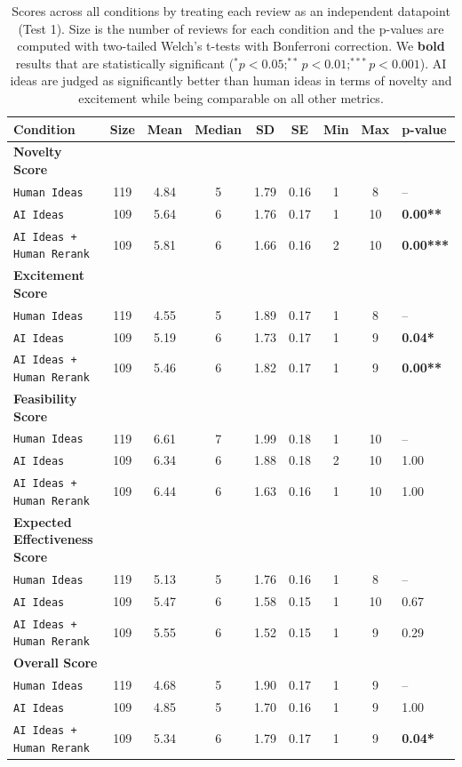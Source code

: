 \begin{table}[t]
\centering
\begin{tabular}{l c c c c c c c l} 
 \hline
 Condition & Size & Mean & Median & SD & SE & Min & Max & p-value \\ 
 \hline 
 \textbf{Novelty Score}  \\
 \texttt{Human Ideas} & 119 & 4.84 & 5 & 1.79 & 0.16 & 1 & 8 & -- \\
 \texttt{AI Ideas} & 109 & 5.64 & 6 & 1.76 & 0.17 & 1 & 10 & \textbf{0.00**} \\
 \texttt{AI Ideas + Human Rerank} & 109 & 5.81 & 6 & 1.66 & 0.16 & 2 & 10 & \textbf{0.00***} \\
\hline 
\textbf{Excitement Score} \\ 
 \texttt{Human Ideas} & 119 & 4.55 & 5 & 1.89 & 0.17 & 1 & 8 & -- \\
 \texttt{AI Ideas} & 109 & 5.19 & 6 & 1.73 & 0.17 & 1 & 9 & \textbf{0.04*} \\
 \texttt{AI Ideas + Human Rerank} & 109 & 5.46 & 6 & 1.82 & 0.17 & 1 & 9 & \textbf{0.00**} \\ 
\hline 
\textbf{Feasibility Score} \\ 
 \texttt{Human Ideas} & 119 & 6.61 & 7 & 1.99 & 0.18 & 1 & 10 & -- \\
 \texttt{AI Ideas} & 109 & 6.34 & 6 & 1.88 & 0.18 & 2 & 10 & 1.00 \\
 \texttt{AI Ideas + Human Rerank} & 109 & 6.44 & 6 & 1.63 & 0.16 & 1 & 10 & 1.00 \\
\hline 
\textbf{Expected Effectiveness Score} \\
 \texttt{Human Ideas} & 119 & 5.13 & 5 & 1.76 & 0.16 & 1 & 8 & -- \\ 
 \texttt{AI Ideas} & 109 & 5.47 & 6 & 1.58 & 0.15 & 1 & 10 & 0.67 \\
 \texttt{AI Ideas + Human Rerank} & 109 & 5.55 & 6 & 1.52 & 0.15 & 1 & 9 & 0.29 \\ 
  \hline
 \textbf{Overall Score} \\
 \texttt{Human Ideas} &  119 & 4.68 & 5 & 1.90 & 0.17 & 1 & 9 & -- \\
 \texttt{AI Ideas} & 109 & 4.85 & 5 & 1.70 & 0.16 & 1 & 9 & 1.00 \\
 \texttt{AI Ideas + Human Rerank} & 109 & 5.34 & 6 & 1.79 & 0.17 & 1 & 9 & \textbf{0.04*} \\
 \hline
\end{tabular}
\caption{Scores across all conditions by treating each review as an independent datapoint (Test 1). Size is the number of reviews for each condition and the p-values are computed with two-tailed Welch's t-tests with Bonferroni correction. We \textbf{bold} results that are statistically significant ($^*p<0.05; ^{**}p<0.01; ^{***}p<0.001$). AI ideas are judged as significantly better than human ideas in terms of novelty and excitement while being comparable on all other metrics.}
\label{table:results_test1}
\end{table}




